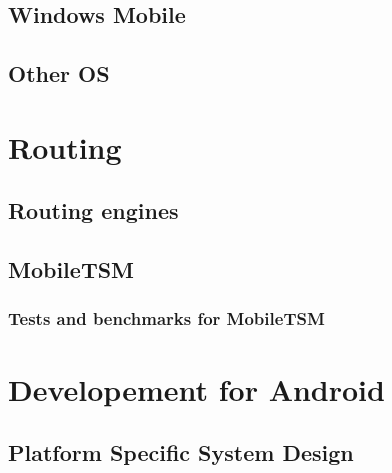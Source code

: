 \documentclass[11pt,a4paper]{scrreprt}
\begin{document}
\section{Windows Mobile} %
\label{sec:win_mobile}


\section{Other OS} %
\label{sec:other_os}




\chapter{Routing} %
\label{sec:android_routing}


\section{Routing engines}
\label{sub:routing_engines}


\section{MobileTSM} %
\label{sub:routing_mobiletsm}


\subsection{Tests and benchmarks for MobileTSM}
\label{sub:routing_testcase}


%



\chapter{Developement for Android} %
\label{chp:android}
%

\section{Platform Specific System Design} %
\label{sec:android_desing}

\end{document}
